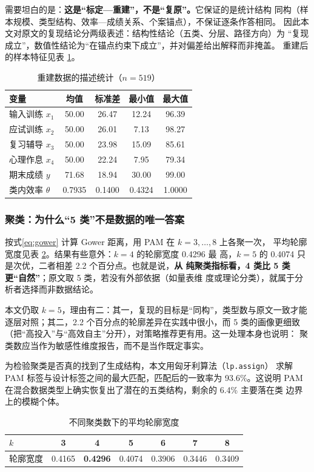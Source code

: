 需要坦白的是：\textbf{这是“标定—重建”，不是“复原”。}它保证的是统计结构
同构（样本规模、类型结构、效率—成绩关系、个案锚点），不保证逐条作答相同。
因此本文对原文的复现结论分两级表述：结构性结论（五类、分层、路径方向）为
“复现成立”，数值性结论为“在锚点约束下成立”，并对偏差给出解释而非掩盖。
重建后的样本特征见表 \ref{tab:desc}。

\begin{table}[htbp]
\centering
\tabfont
\caption{重建数据的描述统计（$n=519$）}
\label{tab:desc}
\begin{tabular}{@{}lcccc@{}}
\toprule
变量 & 均值 & 标准差 & 最小值 & 最大值 \\
\midrule
输入训练 $x_1$ & 50.00 & 26.47 & 12.24 & 96.39 \\
应试训练 $x_2$ & 50.00 & 26.01 & 7.13 & 98.27 \\
复习辅导 $x_3$ & 50.00 & 23.98 & 15.09 & 85.61 \\
心理作息 $x_4$ & 50.00 & 22.24 & 7.95 & 79.34 \\
期末成绩 $y$ & 71.68 & 18.94 & 30.00 & 99.00 \\
类内效率 $\theta$ & 0.7935 & 0.1400 & 0.4324 & 1.0000 \\
\bottomrule
\end{tabular}
\end{table}

\subsubsection{聚类：为什么“5 类”不是数据的唯一答案}

按式\eqref{eq:gower} 计算 Gower 距离，用 PAM 在 $k=3,\dots,8$ 上各聚一次，
平均轮廓宽度见表 \ref{tab:sil}。结果有些意外：$k=4$ 的轮廓宽度 0.4296 最
高，$k=5$ 的 0.4074 只是次优，二者相差 2.2 个百分点。也就是说，\textbf{从
纯聚类指标看，4 类比 5 类更“自然”}；原文取 5 类，若没有外部依据（如量表维
度或理论分类），就属于分析者选择而非数据结论。

本文仍取 $k=5$，理由有二：其一，复现的目标是“同构”，类型数与原文一致才能
逐层对照；其二，2.2 个百分点的轮廓差异在实践中很小，而 5 类的画像更细致
（把“高投入”与“高效自主”分开），对策略推荐更有用。这一处理本身也说明：
聚类数应当作为敏感性维度报告，而不是当作既定事实。

为检验聚类是否真的找到了生成结构，本文用匈牙利算法（\texttt{lp.assign}）
求解 PAM 标签与设计标签之间的最大匹配，匹配后的一致率为 93.6\%。这说明
PAM 在混合数据类型上确实恢复出了潜在的五类结构，剩余的 6.4\% 主要落在类
边界上的模糊个体。

\begin{table}[htbp]
\centering
\tabfont
\caption{不同聚类数下的平均轮廓宽度}
\label{tab:sil}
\begin{tabular}{@{}lcccccc@{}}
\toprule
$k$ & 3 & 4 & 5 & 6 & 7 & 8 \\
\midrule
轮廓宽度 & 0.4165 & \textbf{0.4296} & 0.4074 & 0.3906 & 0.3446 & 0.3409 \\
\bottomrule
\end{tabular}
\end{table}

